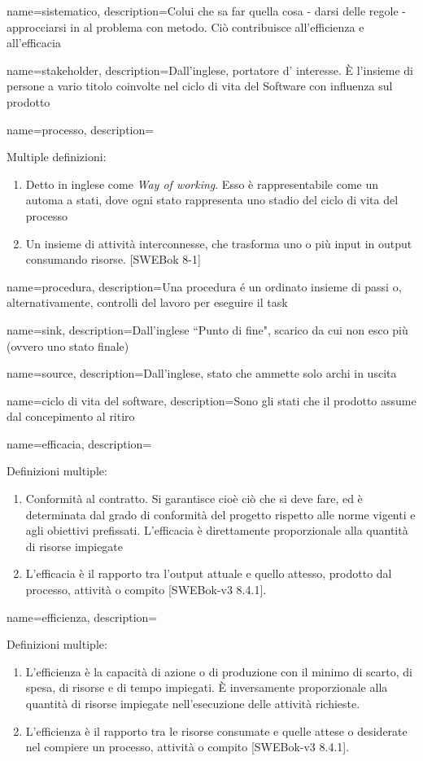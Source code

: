 {
name=sistematico,
description={Colui che sa far quella cosa - darsi delle regole - approcciarsi in al problema con metodo. Ci\`o contribuisce all'efficienza e all'efficacia}
}

{
name=stakeholder,
description={Dall'inglese, portatore d' interesse. È l'insieme di persone a vario titolo coinvolte nel ciclo di vita del Software con influenza sul prodotto}
}

{
name=processo, 
description={Multiple definizioni:
\begin{enumerate}
\item Detto in inglese come \textit{Way of working}. Esso \`e rappresentabile come un automa a stati, dove ogni stato rappresenta uno stadio del ciclo di vita del processo
\item Un insieme di attività interconnesse, che trasforma uno o più input in output consumando risorse. [SWEBok 8-1]
\end{enumerate}
}
}

{
name=procedura,
description={Una procedura \'e un ordinato insieme di passi o, alternativamente, controlli del lavoro per eseguire il task}
}


{
name=sink,
description={Dall'inglese ``Punto di fine", scarico da cui non esco pi\`u (ovvero uno stato finale)}
}

{
name=source,
description={Dall'inglese, stato che ammette solo archi in uscita}
}

{
name=ciclo di vita del software,
description={Sono gli stati che il prodotto assume dal concepimento al ritiro}
}

{
name=efficacia,
description={Definizioni multiple:
\begin{enumerate}
\item Conformit\`a al contratto. Si garantisce cio\`e ci\`o che si deve fare, ed \`e determinata dal grado di conformit\`a del progetto rispetto alle norme vigenti e agli obiettivi prefissati. L'efficacia \`e direttamente proporzionale alla quantit\`a di risorse impiegate
\item L'efficacia \`e il rapporto tra l'output attuale e quello attesso, prodotto dal processo, attivit\`a o compito [SWEBok-v3 8.4.1].
\end{enumerate}
}
}

{
name=efficienza,
description={Definizioni multiple: 
\begin{enumerate}
\item L'efficienza \`e la capacit\`a di azione o di produzione con il minimo di scarto, di spesa, di risorse e di tempo impiegati. \`E inversamente proporzionale alla quantit\`a di risorse impiegate nell'esecuzione delle attivit\`a richieste.
\item L'efficienza \`e il rapporto tra le risorse consumate e quelle attese o desiderate nel compiere un processo, attivit\`a o compito [SWEBok-v3 8.4.1].
\end{enumerate}
}
}

